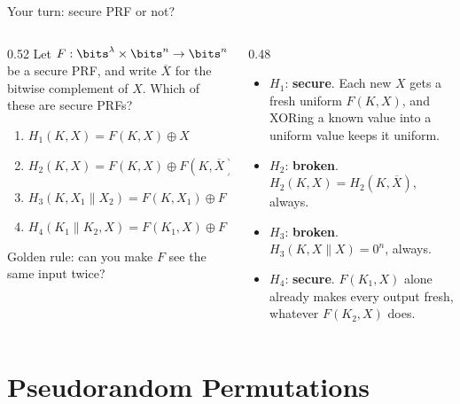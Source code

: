 \ifdefined\PRESENTATION\else\PassOptionsToClass{handout}{beamer}\fi\documentclass[aspectratio=169, lualatex]{beamer}
\begin{document}
\begin{frame}{Your turn: secure PRF or not?}
	\begin{columns}[c]
		\begin{column}{0.52\textwidth}
			Let $F: \bits^\lambda \times \bits^n \rightarrow \bits^n$ be a secure PRF, and write $\overline{X}$ for the bitwise complement of $X$. Which of these are secure PRFs?
			\begin{enumerate}
				\item $H_1(K, X) = F(K, X) \oplus X$
				\item $H_2(K, X) = F(K, X) \oplus F(K, \overline{X})$
				\item $H_3(K, X_1 \| X_2) = F(K, X_1) \oplus F(K, X_2)$
				\item $H_4(K_1 \| K_2, X) = F(K_1, X) \oplus F(K_2, X)$
			\end{enumerate}
			Golden rule: can you make $F$ see the same input twice?
		\end{column}
		\pause
		\begin{column}{0.48\textwidth}
			\begin{itemize}
				\item $H_1$: \textbf{secure}. Each new $X$ gets a fresh uniform $F(K, X)$, and XORing a known value into a uniform value keeps it uniform.
				\item $H_2$: \textbf{broken}. $H_2(K, X) = H_2(K, \overline{X})$, always.
				\item $H_3$: \textbf{broken}. $H_3(K, X \| X) = 0^n$, always.
				\item $H_4$: \textbf{secure}. $F(K_1, X)$ alone already makes every output fresh, whatever $F(K_2, X)$ does.
			\end{itemize}
		\end{column}
	\end{columns}
\end{frame}

\section{Pseudorandom Permutations}
\end{document}
